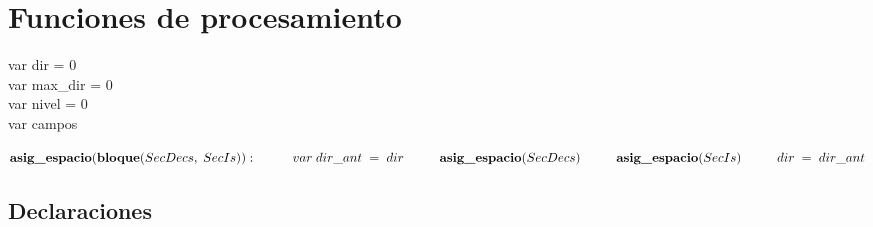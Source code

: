 \section{Funciones de procesamiento}

var dir = 0 \\
var max\_dir = 0 \\
var nivel = 0 \\
var campos

\begin{math}
    \textbf{asig\_espacio}(\textbf{bloque}(SecDecs, \; SecIs)): \\
        \phantom{---} var \; dir\_ant \; = \; dir \\
        \phantom{---} \textbf{asig\_espacio}(SecDecs) \\
        \phantom{---} \textbf{asig\_espacio}(SecIs) \\
        \phantom{---} dir \; = \; dir\_ant
\end{math}

\subsection{Declaraciones}


